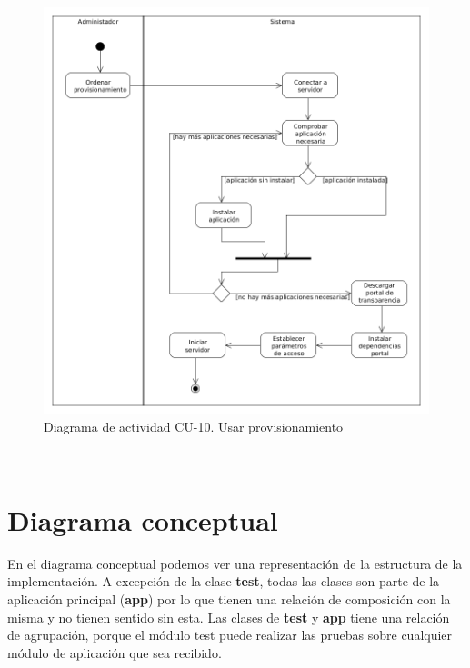 \begin{figure}[!ht]
  \begin{center}
  \includegraphics[width=1\textwidth]{../images/diag_act_cu_10.png}
  \caption{Diagrama de actividad CU-10. Usar provisionamiento}
  \label{fig:diag_act_cu_10}
  \end{center}
\end{figure}

\newpage
\
\newpage
\
\newpage
\
\newpage
\
\newpage
\
\newpage
\
\newpage
\
\newpage
\
\newpage

\section{Diagrama conceptual}

En el diagrama conceptual podemos ver una representación de la estructura de la implementación. A excepción de la clase \textbf{test}, todas las clases son parte de la aplicación principal (\textbf{app}) por lo que tienen una relación de composición con la misma y no tienen sentido sin esta. Las clases de \textbf{test} y \textbf{app} tiene una relación de agrupación, porque el módulo test puede realizar las pruebas sobre cualquier módulo de aplicación que sea recibido.

